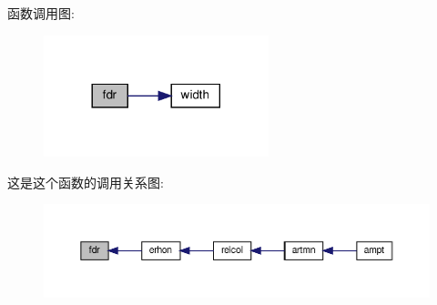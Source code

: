 函数调用图\+:
\nopagebreak
\begin{figure}[H]
\begin{center}
\leavevmode
\includegraphics[width=185pt]{fdr_8f90_a265aefc3c77f64d953925eeffb957a69_cgraph}
\end{center}
\end{figure}
这是这个函数的调用关系图\+:
\nopagebreak
\begin{figure}[H]
\begin{center}
\leavevmode
\includegraphics[width=350pt]{fdr_8f90_a265aefc3c77f64d953925eeffb957a69_icgraph}
\end{center}
\end{figure}

